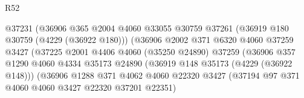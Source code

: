 \begin{lexlean}{R52}
\begin{coremodule}
                                          @37231
                                          (@36906
                                            @365
                                            @2004
                                            @4060
                                            @33055
                                            @30759
                                            @37261
                                            (@36919 @180 @30759 (@4229 (@36922 @180)))
                                            (@36906
                                              @2002
                                              @371
                                              @6320
                                              @4060
                                              @37259
                                              @3427
                                              (@37225
                                                @2001
                                                @4406
                                                @4060
                                                (@35250 @24890)
                                                @37259
                                                (@36906
                                                  @357
                                                  @1290
                                                  @4060
                                                  @4334
                                                  @35173
                                                  @24890
                                                  (@36919 @148 @35173 (@4229 (@36922 @148)))
                                                  (@36906
                                                    @1288
                                                    @371
                                                    @4062
                                                    @4060
                                                    @22320
                                                    @3427
                                                    (@37194
                                                      @97
                                                      @371
                                                      @4060
                                                      @4060
                                                      @3427
                                                      @22320
                                                      @37201
                                                      @22351)

\end{coremodule}
\end{lexlean}
